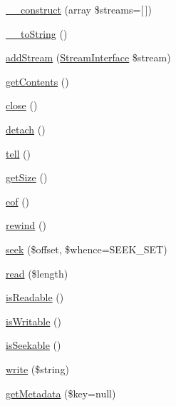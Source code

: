 \begin{DoxyCompactItemize}
\item 
\hyperlink{classGuzzleHttp_1_1Psr7_1_1AppendStream_adc73d5a5599ae48268b8bb024b3ed42d}{\+\_\+\+\_\+construct} (array \$streams=\mbox{[}$\,$\mbox{]})
\item 
\hyperlink{classGuzzleHttp_1_1Psr7_1_1AppendStream_a372f34990a4d8004e6576144eb2182a8}{\+\_\+\+\_\+to\+String} ()
\item 
\hyperlink{classGuzzleHttp_1_1Psr7_1_1AppendStream_a77881cb83e432589325ca0cec8e88036}{add\+Stream} (\hyperlink{interfacePsr_1_1Http_1_1Message_1_1StreamInterface}{Stream\+Interface} \$stream)
\item 
\hyperlink{classGuzzleHttp_1_1Psr7_1_1AppendStream_aee1628457e8ca34d11792dbc20de1ac0}{get\+Contents} ()
\item 
\hyperlink{classGuzzleHttp_1_1Psr7_1_1AppendStream_acba72b0a13e6b2ad6c6cc2a6eeea47cd}{close} ()
\item 
\hyperlink{classGuzzleHttp_1_1Psr7_1_1AppendStream_aa62ff3e927b78109c54708c10f124de0}{detach} ()
\item 
\hyperlink{classGuzzleHttp_1_1Psr7_1_1AppendStream_a011a51b4b1ef1f4b604f64b234be3e77}{tell} ()
\item 
\hyperlink{classGuzzleHttp_1_1Psr7_1_1AppendStream_a72ee87e5953f8de4ccfe5af3cc45cf96}{get\+Size} ()
\item 
\hyperlink{classGuzzleHttp_1_1Psr7_1_1AppendStream_a926c579f7f50d37b6f48b56d039437a5}{eof} ()
\item 
\hyperlink{classGuzzleHttp_1_1Psr7_1_1AppendStream_a39b5d3ea1bcfedcffa3c0210aacb1ae2}{rewind} ()
\item 
\hyperlink{classGuzzleHttp_1_1Psr7_1_1AppendStream_a12cffae90d6bbee5c8ceecc0b27f9a43}{seek} (\$offset, \$whence=S\+E\+E\+K\+\_\+\+S\+ET)
\item 
\hyperlink{classGuzzleHttp_1_1Psr7_1_1AppendStream_a4f80293cfe091483f32343f55d411ef4}{read} (\$length)
\item 
\hyperlink{classGuzzleHttp_1_1Psr7_1_1AppendStream_ac4f681286686c5c62838293e96734bdd}{is\+Readable} ()
\item 
\hyperlink{classGuzzleHttp_1_1Psr7_1_1AppendStream_af63f6bfc1c273407b55b82ad6e4b9e74}{is\+Writable} ()
\item 
\hyperlink{classGuzzleHttp_1_1Psr7_1_1AppendStream_abca8060e94e6c266fb987ae52c9119a2}{is\+Seekable} ()
\item 
\hyperlink{classGuzzleHttp_1_1Psr7_1_1AppendStream_a59f42807cb0e63251779113dd8d80db2}{write} (\$string)
\item 
\hyperlink{classGuzzleHttp_1_1Psr7_1_1AppendStream_afc64ba83a220f390693d76ccf5aca203}{get\+Metadata} (\$key=null)
\end{DoxyCompactItemize}


